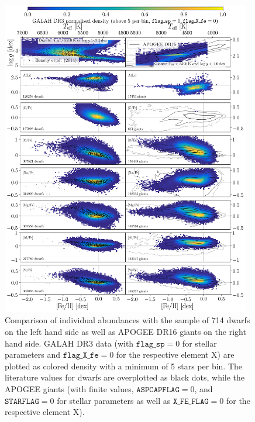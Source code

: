 \documentclass[fleqn,usenatbib,useAMS]{mnras}
\begin{document}
\begin{figure}
  \includegraphics[width=0.975\textwidth]{Figures/Dwarf_Giant_comparison1_flag0.png}
\caption{Comparison of individual abundances with the sample of 714 dwarfs \citep{Bensby2014, Battistini2015, Battistini2016, Bensby2018} on the left hand side as well as APOGEE DR16 giants \citep{SDSSDR16} on the right hand side. GALAH DR3 data (with $\texttt{flag\_sp} = 0$ for stellar parameters and $\texttt{flag\_X\_fe} = 0$ for the respective element X) are plotted as colored density with a minimum of 5 stars per bin. The literature values for dwarfs are overplotted as black dots, while the APOGEE giants (with finite values, $\texttt{ASPCAPFLAG} = 0$, and $\texttt{STARFLAG} = 0$ for stellar parameters as well as $\texttt{X\_FE\_FLAG} = 0$ for the respective element X).}
  \label{fig:Dwarf_Giant_comparison1_flag0}
\end{figure}
\end{document}

